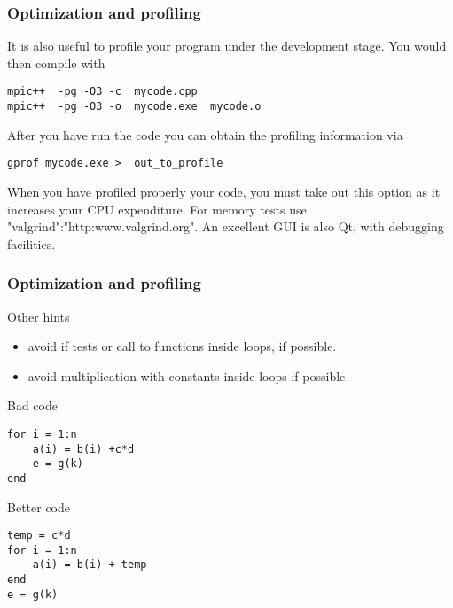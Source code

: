 \documentclass{beamer}
\begin{document}
\begin{frame}
\frametitle{Optimization and profiling}

\begin{block}{}
It is also useful to profile your program under the development stage.
You would then compile with 
\begin{verbatim}
mpic++  -pg -O3 -c  mycode.cpp
mpic++  -pg -O3 -o  mycode.exe  mycode.o
\end{verbatim}
After you have run the code you can obtain the profiling information via
\begin{verbatim}
gprof mycode.exe >  out_to_profile
\end{verbatim}
When you have profiled properly your code, you must take out this option as it 
increases your CPU expenditure.
For memory tests use "valgrind":"http:www.valgrind.org". An excellent GUI is also Qt, with debugging facilities.

\end{block}
\end{frame}

\begin{frame}
\frametitle{Optimization and profiling}

\begin{block}{}
Other hints
\begin{itemize}
\item avoid if tests or call to functions inside loops, if possible. 

\item avoid multiplication with constants inside loops if possible
\end{itemize}

\noindent
Bad code
\begin{verbatim}
for i = 1:n
    a(i) = b(i) +c*d
    e = g(k)
end
\end{verbatim}
Better code
\begin{verbatim}
temp = c*d
for i = 1:n
    a(i) = b(i) + temp
end
e = g(k)
\end{verbatim}


\end{block}
\end{frame}
\end{document}
